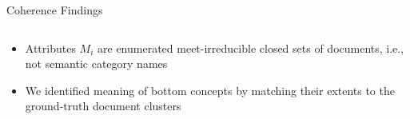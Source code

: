 \begin{frame}{Coherence Findings}
\hypertarget{main:coherence-findings}{}
\small
\begin{columns}[T,onlytextwidth]
\begin{column}{0.65\textwidth}
    \vspace{-2em}
{    
\begin{table}[t]
\caption{Concept pairs with $J(A_1,A_2)>0.5$, where $A_1', A_2'$ denotes the \ac{mlb}-constrained and topic model-based concept intents {\tiny[\hyperlink{appendix:agreement-heatmap}{Details}]}. 
}
\label{tab:concept_jaccard_similarity}
\end{table}}
\vspace{-1em}
\begin{itemize}
    \item<3-> Attributes $M_i$ are enumerated meet-irreducible closed sets of documents, i.e., not semantic category names
    \vspace{-0.5em}
    \item<4-> We identified meaning of bottom concepts by matching their extents to the ground-truth document clusters
    \vspace{-0.5em}
    \begin{itemize}

\end{itemize}
\end{itemize}
\end{column}
\end{columns}
\end{frame}
